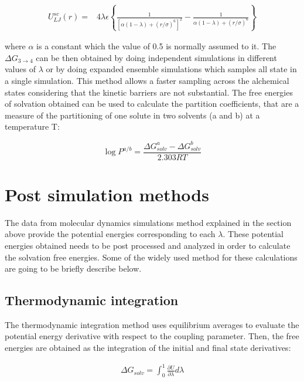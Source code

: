 \begin{equation}
\label{eq:softcoreLJ}
\begin{aligned}
U_{LJ}^{sc}(r) {}=& 4\lambda\epsilon \left\lbrace\frac{1}{\left[\alpha(1-\lambda)+ (r/\sigma)^{6}\right]^{2}} - \frac{1}{\alpha(1-\lambda)+(r/\sigma)^{6}}\right\rbrace
\end{aligned}
\end{equation}

where $\alpha$ is a constant which the value of 0.5 is normally assumed to it. The $\Delta G_{3 \rightarrow 4}$ can be then obtained by doing independent simulations in different values of $\lambda$ or by doing expanded ensemble simulations \cite{lyubartsev} which samples all state in a single simulation. This method allows a faster sampling across the alchemical states considering that the kinetic barriers are not substantial. The free energies of solvation obtained can be used to calculate the partition coefficients, that are a measure of the partitioning of one solute in two solvents (a and b) at a temperature T:

\begin{equation}
\label{eqn:partcoe}
\log{P}^{a/b} = \frac{\Delta G_{solv}^{a} - \Delta G_{solv}^{b}}{2.303RT}
\end{equation}

\section{Post simulation methods}

The data from molecular dynamics simulations method explained in the section above provide the potential energies corresponding to each $\lambda$. These potential energies obtained needs to be post processed and analyzed in order to calculate the solvation free energies. Some of the widely used method for these calculations are going to be briefly describe below. 

\subsection{Thermodynamic integration}

The thermodynamic integration method \cite{kirkwood1935} uses equilibrium averages to evaluate the potential energy derivative with respect to the coupling parameter. Then, the free energies are obtained as the integration of the initial and final state derivatives:

\begin{equation}
\label{eq:ti}
\begin{aligned}
\Delta G_{solv} = \int_{0}^{1} \frac{\partial U}{\partial \lambda} d\lambda
\end{aligned}
\end{equation}

